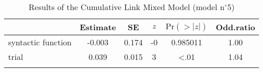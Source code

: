 \begin{table}
\begin{tabular}{l S[table-format=-1.3] S[table-format=1.3] S[table-format=-1] S[table-format=<1.6] S[table-format=1.2]}
  \lsptoprule
 & {Estimate} & {SE} & {$z$} & {$\text{Pr}(>|z|)$} & {Odd.ratio} \\ 
  \midrule
  syntactic function & -0.003 & 0.174 & -0 & 0.985011 & 1.00 \\ 
  trial & 0.039 & 0.015 & 3 & <.01 & 1.04 \\ 
   \lspbottomrule
\end{tabular}
\caption{Results of the Cumulative Link Mixed Model (model n$^{\circ}$5)}
\label{tab:exp14-m5}
\end{table}
